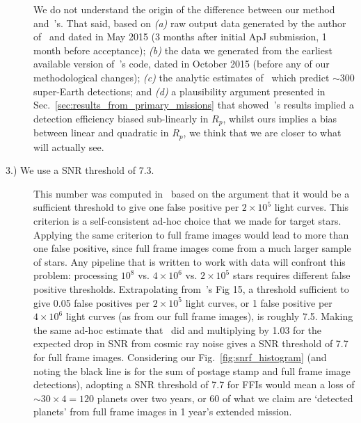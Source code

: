 \begin{description}
	We do not understand the origin of the difference between our method and~'s.
	That said, based on 
	\textit{(a)} raw output data generated by the author of~ and dated in May 2015 (3 months after initial ApJ submission, 1 month before acceptance); 
	\textit{(b)} the data we generated from the earliest available version of~'s code, dated in October 2015 (before any of our methodological changes); 
	\textit{(c)} the analytic estimates of~\citet{winn_searchable_2013} which predict $\sim300$ super-Earth detections;
	and \textit{(d)} a plausibility argument presented in Sec.~\ref{sec:results_from_primary_missions} that showed~'s results implied a detection efficiency biased sub-linearly in $R_p$, whilst ours implies a bias between linear and quadratic in $R_p$,
	we think that we are closer to what \tess will actually see.
	
	\item[3.) We use a SNR threshold of 7.3.] This number was computed in~ based on the argument that it would be a sufficient threshold to give one false positive per $2\times10^5$ light curves.
	This criterion is a self-consistent ad-hoc choice that we made for target stars.
	Applying the same criterion to full frame images would lead to more than one false positive, since full frame images come from a much larger sample of stars.
	Any pipeline that is written to work with \tess data will confront this problem:
	processing $10^8$ vs. $4\times10^6$ vs. $2\times10^5$ stars requires different false positive thresholds.
	Extrapolating from~'s Fig 15, a threshold sufficient to give 0.05 false positives per $2\times10^5$ light curves, or 1 false positive per $4\times10^6$ light curves (as from our full frame images), is roughly 7.5.
	Making the same ad-hoc estimate that~ did and multiplying by 1.03 for the expected drop in SNR from cosmic ray noise gives a SNR threshold of 7.7 for full frame images.
	Considering our Fig.~\ref{fig:snrf_histogram} (and noting the black line is for the sum of postage stamp and full frame image detections), adopting a SNR threshold of 7.7 for FFIs would mean a loss of $\sim30\times4=120$ planets over two years, or 60 of what we claim are `detected planets' from full frame images in 1 year's extended mission.	
	

\end{description}
